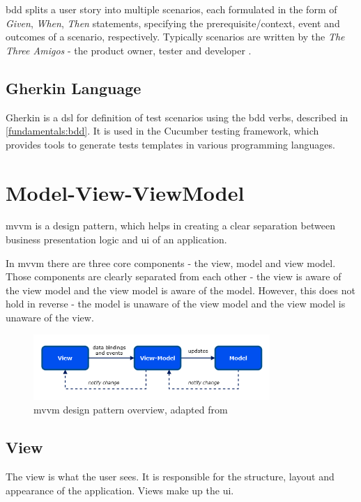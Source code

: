 \gls{bdd} splits a user story into multiple scenarios, each formulated in the form of \textit{Given}, \textit{When}, \textit{Then} statements, specifying the prerequisite/context, event and outcomes of a scenario, respectively. 
\label{amigos}
Typically scenarios are written by the \textit{The Three Amigos} - the product owner, tester and developer \parencite{cucumber_amigos}.

\subsection{Gherkin Language}

Gherkin \parencite{gherkin_language} is a \gls{dsl} for definition of test scenarios using the \gls{bdd} verbs, described in \ref{fundamentals:bdd}. It is used in the Cucumber testing framework, which provides tools to generate tests templates in various programming languages.

\section{Model-View-ViewModel}
\label{sec:mvvm}
\gls{mvvm} is a design pattern, which helps in creating a clear separation between business presentation logic and \gls{ui} of an application. \parencite[7-9]{microsoft_mvvm}

In \gls{mvvm} there are three core components - the view, model and view model. Those components are clearly separated from each other - the view is aware of the view model and the view model is aware of the model. However, this does not hold in reverse - the model is unaware of the view model and the view model is unaware of the view. 

\begin{figure}[H]
  \centering
  \includegraphics[width=0.8\textwidth]{images/mvvm.png}
   \caption{\gls{mvvm} design pattern overview, adapted from \parencite[7]{microsoft_mvvm}}
   \label{fig:mvvm}
 \end{figure}

\subsection{View}
The view is what the user sees. It is responsible for the structure, layout and appearance of the application. Views make up the \gls{ui}.

